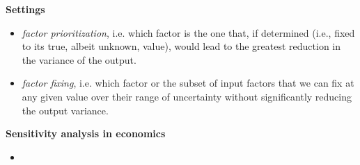 \begin{frame}\textbf{Settings}\vspace{0.3cm}

\begin{itemize}\setlength\itemsep{1em}
  \item \textit{factor prioritization}, i.e. which factor is the one that, if determined (i.e., fixed to its true, albeit unknown, value), would lead
to the greatest reduction in the variance of the output.
  \item \textit{factor fixing}, i.e. which factor or the subset of input factors that we can fix at any given value over their range of uncertainty without significantly reducing the output variance.
\end{itemize}

\end{frame}
\begin{frame}\textbf{Sensitivity analysis in economics}\vspace{0.3cm}

  \begin{itemize}
  \item {}
  \end{itemize}

\end{frame}
